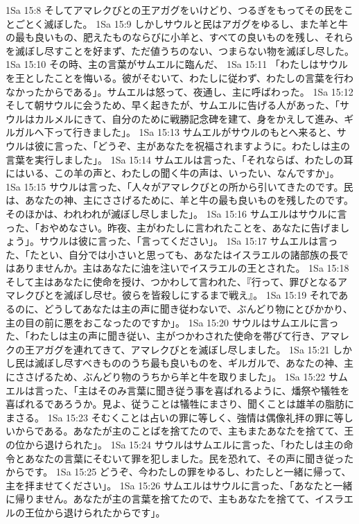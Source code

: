 1Sa 15:8  そしてアマレクびとの王アガグをいけどり、つるぎをもってその民をことごとく滅ぼした。
1Sa 15:9  しかしサウルと民はアガグをゆるし、また羊と牛の最も良いもの、肥えたものならびに小羊と、すべての良いものを残し、それらを滅ぼし尽すことを好まず、ただ値うちのない、つまらない物を滅ぼし尽した。
1Sa 15:10  その時、主の言葉がサムエルに臨んだ、
1Sa 15:11  「わたしはサウルを王としたことを悔いる。彼がそむいて、わたしに従わず、わたしの言葉を行わなかったからである」。サムエルは怒って、夜通し、主に呼ばわった。
1Sa 15:12  そして朝サウルに会うため、早く起きたが、サムエルに告げる人があった、「サウルはカルメルにきて、自分のために戦勝記念碑を建て、身をかえして進み、ギルガルへ下って行きました」。
1Sa 15:13  サムエルがサウルのもとへ来ると、サウルは彼に言った、「どうぞ、主があなたを祝福されますように。わたしは主の言葉を実行しました」。
1Sa 15:14  サムエルは言った、「それならば、わたしの耳にはいる、この羊の声と、わたしの聞く牛の声は、いったい、なんですか」。
1Sa 15:15  サウルは言った、「人々がアマレクびとの所から引いてきたのです。民は、あなたの神、主にささげるために、羊と牛の最も良いものを残したのです。そのほかは、われわれが滅ぼし尽しました」。
1Sa 15:16  サムエルはサウルに言った、「おやめなさい。昨夜、主がわたしに言われたことを、あなたに告げましょう」。サウルは彼に言った、「言ってください」。
1Sa 15:17  サムエルは言った、「たとい、自分では小さいと思っても、あなたはイスラエルの諸部族の長ではありませんか。主はあなたに油を注いでイスラエルの王とされた。
1Sa 15:18  そして主はあなたに使命を授け、つかわして言われた、『行って、罪びとなるアマレクびとを滅ぼし尽せ。彼らを皆殺しにするまで戦え』。
1Sa 15:19  それであるのに、どうしてあなたは主の声に聞き従わないで、ぶんどり物にとびかかり、主の目の前に悪をおこなったのですか」。
1Sa 15:20  サウルはサムエルに言った、「わたしは主の声に聞き従い、主がつかわされた使命を帯びて行き、アマレクの王アガグを連れてきて、アマレクびとを滅ぼし尽しました。
1Sa 15:21  しかし民は滅ぼし尽すべきもののうち最も良いものを、ギルガルで、あなたの神、主にささげるため、ぶんどり物のうちから羊と牛を取りました」。
1Sa 15:22  サムエルは言った、「主はそのみ言葉に聞き従う事を喜ばれるように、燔祭や犠牲を喜ばれるであろうか。見よ、従うことは犠牲にまさり、聞くことは雄羊の脂肪にまさる。
1Sa 15:23  そむくことは占いの罪に等しく、強情は偶像礼拝の罪に等しいからである。あなたが主のことばを捨てたので、主もまたあなたを捨てて、王の位から退けられた」。
1Sa 15:24  サウルはサムエルに言った、「わたしは主の命令とあなたの言葉にそむいて罪を犯しました。民を恐れて、その声に聞き従ったからです。
1Sa 15:25  どうぞ、今わたしの罪をゆるし、わたしと一緒に帰って、主を拝ませてください」。
1Sa 15:26  サムエルはサウルに言った、「あなたと一緒に帰りません。あなたが主の言葉を捨てたので、主もあなたを捨てて、イスラエルの王位から退けられたからです」。
